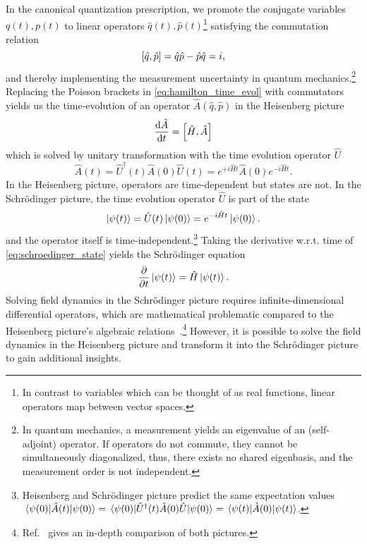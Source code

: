 In the canonical quantization prescription, we promote the conjugate variables $q(t),p(t)$ to linear operators $\hat{q}(t),\hat{p}(t)$\footnote{In contrast to variables which can be thought of as real functions, linear operators map between vector spaces.} satisfying the commutation relation
\begin{equation}
    \comm{\hat{q}}{\hat{p}}
    =
    \hat{q}\hat{p}
    -
    \hat{p}\hat{q}
    =
    i
    \label{eq:comm_pm},
\end{equation}
and thereby implementing the measurement uncertainty in quantum mechanics.\footnote{In quantum mechanics, a measurement yields an eigenvalue of an (self-adjoint) operator. If operators do not commute, they cannot be simultaneously diagonalized, thus, there exists no shared eigenbasis, and the measurement order is not independent.}
Replacing the Poisson brackets in \cref{eq:hamilton_time_evol} with commutators yields us the time-evolution of an operator $\hat{A}(\hat{q},\hat{p})$ in the Heisenberg picture
\begin{equation}
    \dv{\hat{A}}{t}
    =
    \comm{\hat{H}}{\hat{A}}
    \label{eq:heisenberg_time_evol}
\end{equation}
which is solved by unitary transformation with the time evolution operator $\hat{U}$
\begin{equation}
    \hat{A}(t)
    =
    \hat{U}^\dagger(t)
    \hat{A}(0)
    \hat{U}(t)
    =
    e^{+i\hat{H}t}\hat{A}(0)e^{-i\hat{H}t}
    \label{eq:heisenberg_time_evol_sol}.
\end{equation}
In the Heisenberg picture, operators are time-dependent but states are not.
In the Schrödinger picture, the time evolution operator $\hat{U}$ is part of the state
\begin{equation}
    \ket{\psi(t)}
    =
    \hat{U}(t)\ket{\psi(0)}
    =
    e^{-i\hat{H}t}\ket{\psi(0)}
    \label{eq:schroedinger_state}.
\end{equation}
and the operator itself is time-independent.\footnote{Heisenberg and Schrödinger picture predict the same expectation values $\expval{\hat{A}(t)}{\psi(0)}=\expval{\hat{U}^\dagger(t)\hat{A}(0)\hat{U}}{\psi(0)}=\expval{\hat{A}(0)}{\psi(t)}$.}
Taking the derivative w.r.t. time of \cref{eq:schroedinger_state} yields the Schrödinger equation
\begin{equation}
    \pdv{t}\ket{\psi(t)}
    =
    \hat{H}\ket{\psi(t)}
    \label{eq:schroedinger_time_evol}.
\end{equation}
Solving field dynamics in the Schrödinger picture requires infinite-dimensional differential operators, which are mathematical problematic compared to the Heisenberg picture's algebraic relations~\cite[p.~19]{Fulling1989}.\footnote{Ref.~\cite[p.~19]{Fulling1989} gives an in-depth comparison of both pictures.}
However, it is possible to solve the field dynamics in the Heisenberg picture and transform it into the Schrödinger picture to gain additional insights.

